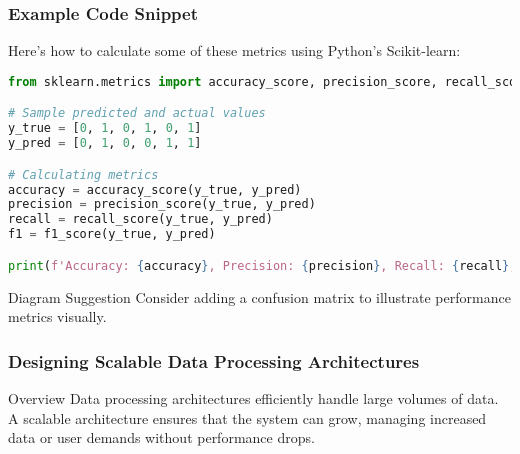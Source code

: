 \documentclass[aspectratio=169]{beamer}
\begin{document}
\begin{frame}[fragile]
    \frametitle{Example Code Snippet}
    Here’s how to calculate some of these metrics using Python's Scikit-learn:
    
    \begin{lstlisting}[language=Python]
from sklearn.metrics import accuracy_score, precision_score, recall_score, f1_score

# Sample predicted and actual values
y_true = [0, 1, 0, 1, 0, 1]
y_pred = [0, 1, 0, 0, 1, 1]

# Calculating metrics
accuracy = accuracy_score(y_true, y_pred)
precision = precision_score(y_true, y_pred)
recall = recall_score(y_true, y_pred)
f1 = f1_score(y_true, y_pred)

print(f'Accuracy: {accuracy}, Precision: {precision}, Recall: {recall}, F1 Score: {f1}')
    \end{lstlisting}
    
    \begin{block}{Diagram Suggestion}
        Consider adding a confusion matrix to illustrate performance metrics visually.
    \end{block}
\end{frame}

\begin{frame}[fragile]
    \frametitle{Designing Scalable Data Processing Architectures}
    \begin{block}{Overview}
        Data processing architectures efficiently handle large volumes of data. 
        A scalable architecture ensures that the system can grow, managing increased data or user demands without performance drops.
    \end{block}
\end{frame}
\end{document}
